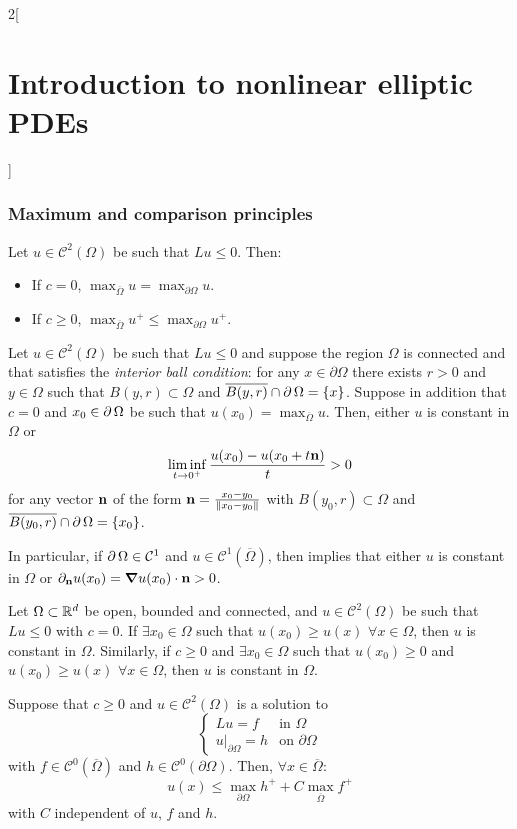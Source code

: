 \documentclass[../../../main_math.tex]{subfiles}
\begin{document}
\begin{multicols}{2}[\section{Introduction to nonlinear elliptic PDEs}]
  \subsubsection{Maximum and comparison principles}
  \begin{theorem}
    Let $u\in \mathcal{C}^2(\Omega)$ be such that $Lu\leq 0$. Then:
    \begin{itemize}
      \item If $c=0$, $\displaystyle \max_{\overline{\Omega}}u=\max_{\partial\Omega}u$.
      \item If $c\geq 0$, $\displaystyle \max_{\overline{\Omega}}u^+\leq \max_{\partial\Omega}u^+$.
    \end{itemize}
  \end{theorem}
  \begin{lemma}\label{INLEPDE:Hopf}
    Let $u\in \mathcal{C}^2(\Omega)$ be such that $Lu\leq 0$ and suppose the region $\Omega$ is connected and that satisfies the \emph{interior ball condition}: for any $x\in \partial\Omega$ there exists $r>0$ and $y\in \Omega$ such that $B(y,r)\subset \Omega$ and $\overline{B(y,r)}\cap \operatorname{\partial}{\Omega}=\{x\}$. Suppose in addition that $c=0$ and $x_0\in\operatorname{\partial}\Omega$ be such that $u(x_0)=\max_{\overline{\Omega}}u$. Then, either $u$ is constant in $\Omega$ or
    $$
      \liminf_{t\to 0^+}\frac{u(x_0) - u(x_0+t\boldsymbol{\mathrm{n}})}{t}>0
    $$
    for any vector $\boldsymbol{\mathrm{n}}$ of the form $\boldsymbol{\mathrm{n}}=\frac{x_0-y_0}{\left\|x_0-y_0\right\|}$ with $B(y_0,r)\subset \Omega$ and $\overline{B(y_0,r)}\cap \operatorname{\partial}{\Omega}=\{x_0\}$.
  \end{lemma}
  \begin{remark}
    In particular, if $\operatorname{\partial}\Omega\in\mathcal{C}^1$ and $u\in \mathcal{C}^1(\overline{\Omega})$, then  implies that either $u$ is constant in $\Omega$ or $\partial_{\boldsymbol{\mathrm{n}}}u(x_0)=\grad u(x_0)\cdot \boldsymbol{\mathrm{n}}>0$.
  \end{remark}
  \begin{theorem}
    Let $\Omega\subset\mathbb{R}^d$ be open, bounded and connected, and $u\in \mathcal{C}^2(\Omega)$ be such that $Lu\leq 0$ with $c=0$. If $\exists x_0\in\Omega$ such that $u(x_0)\geq u(x)$ $\forall x\in\Omega$, then $u$ is constant in $\Omega$. Similarly, if $c\geq 0$ and $\exists x_0\in\Omega$ such that $u(x_0)\geq 0$ and $u(x_0)\geq u(x)$ $\forall x\in\Omega$, then $u$ is constant in $\Omega$.
  \end{theorem}
  \begin{theorem}
    Suppose that $c\geq 0$ and $u\in \mathcal{C}^2(\Omega)$ is a solution to
    $$
      \begin{cases}
        Lu=f                  & \text{in }\Omega         \\
        u|_{\partial\Omega}=h & \text{on }\partial\Omega
      \end{cases}
    $$
    with $f\in \mathcal{C}^0(\overline{\Omega})$ and $h\in \mathcal{C}^0(\partial\Omega)$. Then, $\forall x\in\overline{\Omega}$:
    $$
      u(x)\leq \max_{\partial\Omega}h^++C\max_{\overline{\Omega}}f^+
    $$
    with $C$ independent of $u$, $f$ and $h$.
  \end{theorem}

\end{multicols}
\end{document}
